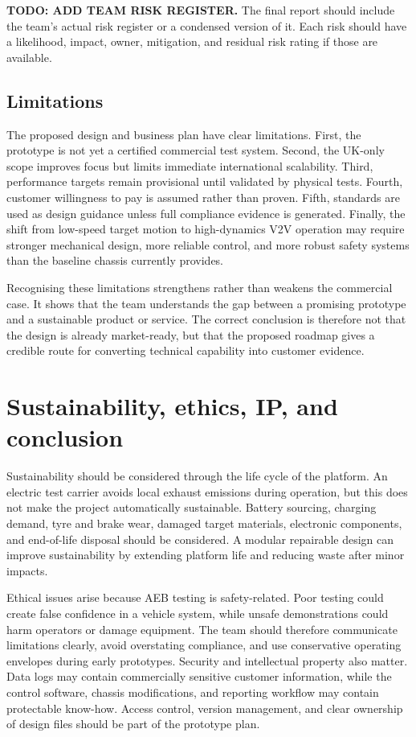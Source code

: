 \textbf{TODO: ADD TEAM RISK REGISTER.} The final report should include the team's actual risk register or a condensed version of it. Each risk should have a likelihood, impact, owner, mitigation, and residual risk rating if those are available.

\subsection{Limitations}

The proposed design and business plan have clear limitations. First, the prototype is not yet a certified commercial test system. Second, the UK-only scope improves focus but limits immediate international scalability. Third, performance targets remain provisional until validated by physical tests. Fourth, customer willingness to pay is assumed rather than proven. Fifth, standards are used as design guidance unless full compliance evidence is generated. Finally, the shift from low-speed target motion to high-dynamics V2V operation may require stronger mechanical design, more reliable control, and more robust safety systems than the baseline chassis currently provides.

Recognising these limitations strengthens rather than weakens the commercial case. It shows that the team understands the gap between a promising prototype and a sustainable product or service. The correct conclusion is therefore not that the design is already market-ready, but that the proposed roadmap gives a credible route for converting technical capability into customer evidence.

\section{Sustainability, ethics, IP, and conclusion}

Sustainability should be considered through the life cycle of the platform. An electric test carrier avoids local exhaust emissions during operation, but this does not make the project automatically sustainable. Battery sourcing, charging demand, tyre and brake wear, damaged target materials, electronic components, and end-of-life disposal should be considered. A modular repairable design can improve sustainability by extending platform life and reducing waste after minor impacts.

Ethical issues arise because AEB testing is safety-related. Poor testing could create false confidence in a vehicle system, while unsafe demonstrations could harm operators or damage equipment. The team should therefore communicate limitations clearly, avoid overstating compliance, and use conservative operating envelopes during early prototypes. Security and intellectual property also matter. Data logs may contain commercially sensitive customer information, while the control software, chassis modifications, and reporting workflow may contain protectable know-how. Access control, version management, and clear ownership of design files should be part of the prototype plan.

